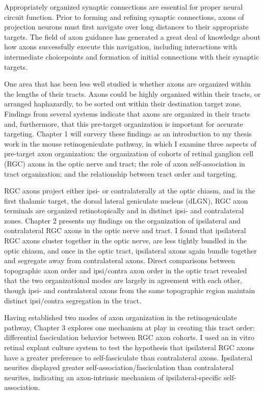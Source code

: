 Appropriately organized synaptic connections are essential for proper neural circuit function.
Prior to forming and refining synaptic connections, axons of projection neurons must first navigate over long distances to their appropriate targets.
The field of axon guidance has generated a great deal of knowledge about how axons successfully execute this navigation, including interactions with intermediate choicepoints and formation of initial connections with their synaptic targets.

One area that has been less well studied is whether axons are organized within the lengths of their tracts.
Axons could be highly organized within their tracts, or arranged haphazardly, to be sorted out within their destination target zone.
Findings from several systems indicate that axons are organized in their tracts and, furthermore, that this pre-target organization is important for accurate targeting.
Chapter 1 will survery these findings as an introduction to my thesis work in the mouse retinogeniculate pathway, in which I examine three aspects of pre-target axon organization: the organization of cohorts of retinal ganglion cell (RGC) axons in the optic nerve and tract; the role of axon self-association in tract organization; and the relationship between tract order and targeting.

RGC axons project either ipsi- or contralaterally at the optic chiasm, and in the first thalamic target, the dorsal lateral geniculate nucleus (dLGN), RGC axon terminals are organized retinotopically and in distinct ipsi- and contralateral zones.
Chapter 2 presents my findings on the organization of ipsilateral and contralateral RGC axons in the optic nerve and tract.
I found that ipsilateral RGC axons cluster together in the optic nerve, are less tightly bundled in the optic chiasm, and once in the optic tract, ipsilateral axons again bundle together and segregate away from contralateral axons.
Direct comparisons between topographic axon order and ipsi/contra axon order in the optic tract revealed that the two organizational modes are largely in agreement with each other, though ipsi- and contralateral axons from the same topographic region maintain distinct ipsi/contra segregation in the tract.

Having established two modes of axon organization in the retinogeniculate pathway, Chapter 3 explores one mechanism at play in creating this tract order: differential fasciculation behavior between RGC axon cohorts.
I used an in vitro retinal explant culture system to test the hypothesis that ipsilateral RGC axons have a greater preference to self-fasciculate than contralateral axons.
Ipsilateral neurites displayed greater self-association/fasciculation than contralateral neurites, indicating an axon-intrinsic mechanism of ipsilateral-specific self-association. 

